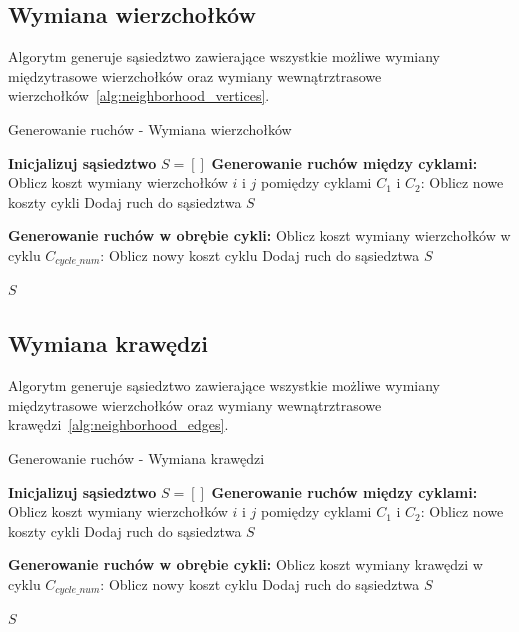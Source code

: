 \documentclass[12pt,a4paper]{article}
\begin{document}
\subsection{Wymiana wierzchołków}
Algorytm generuje sąsiedztwo zawierające wszystkie możliwe wymiany międzytrasowe wierzchołków oraz wymiany wewnątrztrasowe wierzchołków~\ref{alg:neighborhood_vertices}.


\begin{algorithm}[H]
\caption{Generowanie ruchów - Wymiana wierzchołków}
\label{alg:neighborhood_vertices}
\begin{algorithmic}[1]
\State \textbf{Inicjalizuj sąsiedztwo}
\State $S = []$
\State \textbf{Generowanie ruchów między cyklami:}
        \State Oblicz koszt wymiany wierzchołków $i$ i $j$ pomiędzy cyklami $C_1$ i $C_2$:
        \State Oblicz nowe koszty cykli
        \State Dodaj ruch do sąsiedztwa $S$
    \EndFor
\EndFor

\State \textbf{Generowanie ruchów w obrębie cykli:}
            \State Oblicz koszt wymiany wierzchołków w cyklu $C_{cycle\_num}$:
            \State Oblicz nowy koszt cyklu
            \State Dodaj ruch do sąsiedztwa $S$
        \EndFor
    \EndFor
\EndFor

\State \Return $S$
\end{algorithmic}
\end{algorithm}

\newpage
\subsection{Wymiana krawędzi}
Algorytm generuje sąsiedztwo zawierające wszystkie możliwe wymiany międzytrasowe wierzchołków oraz wymiany wewnątrztrasowe krawędzi~\ref{alg:neighborhood_edges}.

\begin{algorithm}[H]
\caption{Generowanie ruchów - Wymiana krawędzi}
\label{alg:neighborhood_edges}
\begin{algorithmic}[1]
\State \textbf{Inicjalizuj sąsiedztwo}
\State $S = []$
\State \textbf{Generowanie ruchów między cyklami:}
        \State Oblicz koszt wymiany wierzchołków $i$ i $j$ pomiędzy cyklami $C_1$ i $C_2$:
        \State Oblicz nowe koszty cykli
        \State Dodaj ruch do sąsiedztwa $S$
    \EndFor
\EndFor

\State \textbf{Generowanie ruchów w obrębie cykli:}
            \State Oblicz koszt wymiany krawędzi w cyklu $C_{cycle\_num}$:
            \State Oblicz nowy koszt cyklu
            \State Dodaj ruch do sąsiedztwa $S$
        \EndFor
    \EndFor
\EndFor

\State \Return $S$
\end{algorithmic}
\end{algorithm}
\end{document}
